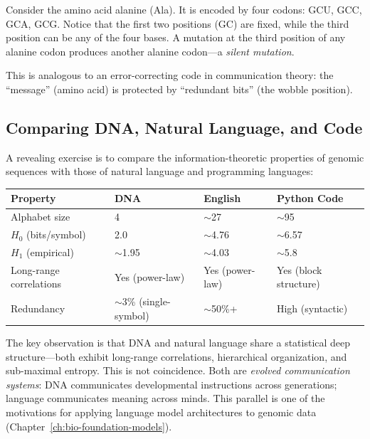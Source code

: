 \begin{example}
Consider the amino acid alanine (Ala). It is encoded by four codons: GCU, GCC, GCA, GCG. Notice that the first two positions (GC) are fixed, while the third position can be any of the four bases. A mutation at the third position of any alanine codon produces another alanine codon---a \emph{silent mutation}.

This is analogous to an error-correcting code in communication theory: the ``message'' (amino acid) is protected by ``redundant bits'' (the wobble position).
\end{example}

\subsection{Comparing DNA, Natural Language, and Code}

A revealing exercise is to compare the information-theoretic properties of genomic sequences with those of natural language and programming languages:

\begin{center}
\renewcommand{\arraystretch}{1.15}
\begin{tabularx}{0.95\textwidth}{L{3cm} C{2cm} C{2cm} Y}
\toprule
\textbf{Property} & \textbf{DNA} & \textbf{English} & \textbf{Python Code} \\
\midrule
Alphabet size & 4 & $\sim$27 & $\sim$95 \\
$H_0$ (bits/symbol) & 2.0 & $\sim$4.76 & $\sim$6.57 \\
$H_1$ (empirical) & $\sim$1.95 & $\sim$4.03 & $\sim$5.8 \\
Long-range correlations & Yes (power-law) & Yes (power-law) & Yes (block structure) \\
Redundancy & $\sim$3\% (single-symbol) & $\sim$50\%+ & High (syntactic) \\
\bottomrule
\end{tabularx}
\end{center}

The key observation is that DNA and natural language share a statistical deep structure---both exhibit long-range correlations, hierarchical organization, and sub-maximal entropy. This is not coincidence. Both are \emph{evolved communication systems}: DNA communicates developmental instructions across generations; language communicates meaning across minds. This parallel is one of the motivations for applying language model architectures to genomic data (Chapter~\ref{ch:bio-foundation-models}).

